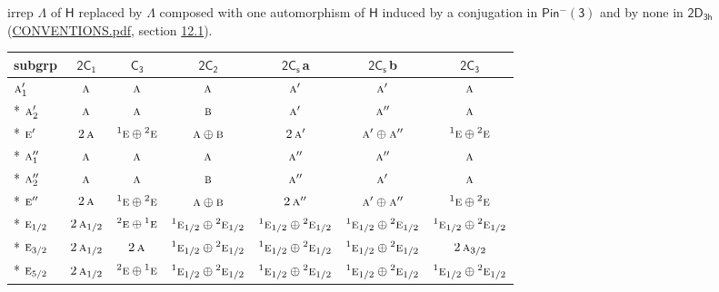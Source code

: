 \documentclass[10pt,a4paper]{article}
\numberwithin{equation}{section}
\newcommand{\grp}[1]{\mathsf{#1}}
\newcommand{\irr}[1]{\text{\normalfont\scshape #1}}
\newcommand{\conjpair}[1]{{}^{#1}}
\newcommand{\clsletter}[1]{\,{\scriptsize\color{black!55}#1}}
\begin{document}
irrep $\Lambda$ of $\grp{H}$ replaced by $\Lambda$ composed with one automorphism of $\grp{H}$ induced by a conjugation in \href{Pinminus3.pdf}{$\grp{Pin^{-}(3)}$} and by none in $\grp{2D_{3h}}$ (\href{../../CONVENTIONS.pdf}{CONVENTIONS.pdf}, section \href{../../../rotation/CONVENTIONS.pdf\#conv.12.1}{12.1}).
{\small\begin{longtable}{@{}lcccccc@{}}\toprule
subgrp & \href{2C1.pdf}{$\grp{2C_{1}}$} & \href{C3.pdf}{$\grp{C_{3}}$} & \href{2C2.pdf}{$\grp{2C_{2}}$} & \href{2C1v.pdf}{$\grp{2C_{s}}$}\clsletter{a} & \href{2C1v.pdf}{$\grp{2C_{s}}$}\clsletter{b} & \href{2C3.pdf}{$\grp{2C_{3}}$}\\\midrule\endhead
\bottomrule\endfoot\endlastfoot
$\irr{a}_{1}'$ & $\irr{a}$ & $\irr{a}$ & $\irr{a}$ & $\irr{a}'$ & $\irr{a}'$ & $\irr{a}$\\*
$\irr{a}_{2}'$ & $\irr{a}$ & $\irr{a}$ & $\irr{b}$ & $\irr{a}'$ & $\irr{a}''$ & $\irr{a}$\\*
$\irr{e}'$ & $2\,\irr{a}$ & $\conjpair{1}\irr{e}\oplus \conjpair{2}\irr{e}$ & $\irr{a}\oplus \irr{b}$ & $2\,\irr{a}'$ & $\irr{a}'\oplus \irr{a}''$ & $\conjpair{1}\irr{e}\oplus \conjpair{2}\irr{e}$\\*
$\irr{a}_{1}''$ & $\irr{a}$ & $\irr{a}$ & $\irr{a}$ & $\irr{a}''$ & $\irr{a}''$ & $\irr{a}$\\*
$\irr{a}_{2}''$ & $\irr{a}$ & $\irr{a}$ & $\irr{b}$ & $\irr{a}''$ & $\irr{a}'$ & $\irr{a}$\\*
$\irr{e}''$ & $2\,\irr{a}$ & $\conjpair{1}\irr{e}\oplus \conjpair{2}\irr{e}$ & $\irr{a}\oplus \irr{b}$ & $2\,\irr{a}''$ & $\irr{a}'\oplus \irr{a}''$ & $\conjpair{1}\irr{e}\oplus \conjpair{2}\irr{e}$\\*
$\irr{e}_{1/2}$ & $2\,\irr{a}_{1/2}$ & $\conjpair{2}\irr{e}\oplus \conjpair{1}\irr{e}$ & $\conjpair{1}\irr{e}_{1/2}\oplus \conjpair{2}\irr{e}_{1/2}$ & $\conjpair{1}\irr{e}_{1/2}\oplus \conjpair{2}\irr{e}_{1/2}$ & $\conjpair{1}\irr{e}_{1/2}\oplus \conjpair{2}\irr{e}_{1/2}$ & $\conjpair{1}\irr{e}_{1/2}\oplus \conjpair{2}\irr{e}_{1/2}$\\*
$\irr{e}_{3/2}$ & $2\,\irr{a}_{1/2}$ & $2\,\irr{a}$ & $\conjpair{1}\irr{e}_{1/2}\oplus \conjpair{2}\irr{e}_{1/2}$ & $\conjpair{1}\irr{e}_{1/2}\oplus \conjpair{2}\irr{e}_{1/2}$ & $\conjpair{1}\irr{e}_{1/2}\oplus \conjpair{2}\irr{e}_{1/2}$ & $2\,\irr{a}_{3/2}$\\*
$\irr{e}_{5/2}$ & $2\,\irr{a}_{1/2}$ & $\conjpair{2}\irr{e}\oplus \conjpair{1}\irr{e}$ & $\conjpair{1}\irr{e}_{1/2}\oplus \conjpair{2}\irr{e}_{1/2}$ & $\conjpair{1}\irr{e}_{1/2}\oplus \conjpair{2}\irr{e}_{1/2}$ & $\conjpair{1}\irr{e}_{1/2}\oplus \conjpair{2}\irr{e}_{1/2}$ & $\conjpair{1}\irr{e}_{1/2}\oplus \conjpair{2}\irr{e}_{1/2}$\\
\bottomrule\end{longtable}}
\end{document}
